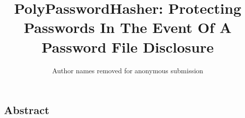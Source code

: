 \documentclass{sig-alternate}
\begin{document}

\newcommand{\cappos}[1]{{\color{red} [JustinC: #1]}}
\newcommand{\eat}[1]{}

\newcommand{\showurlx}{[redacted]}


\lstset{basicstyle=\small, stringstyle=\ttfamily}

\date{}

\title{PolyPasswordHasher: Protecting Passwords In The Event Of A Password File 
Disclosure}


\author{ Author names removed for anonymous submission}

\maketitle

\thispagestyle{empty}

\subsection*{Abstract}






















%







\end{document}
